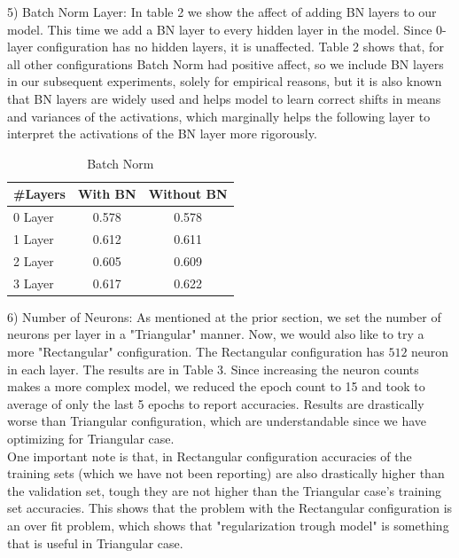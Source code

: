 \documentclass[conference,compsoc]{IEEEtran}
\begin{document}
5) Batch Norm Layer: In table 2 we show the affect of adding BN layers to our model. This time we add a BN layer to every hidden layer in the model. Since 0-layer configuration has no hidden layers, it is unaffected. Table 2 shows that, for all other configurations Batch Norm had positive affect, so we include BN layers in our subsequent experiments, solely for empirical reasons, but it is also known that BN layers are widely used and helps model to learn correct shifts in means and variances of the activations, which marginally helps the following layer to interpret the activations of the BN layer more rigorously.  \\

\begin{table}[]
\centering
\caption{Batch Norm}
\label{my-label}
\begin{tabular}{l|cc}
\#Layers & \multicolumn{1}{l}{With BN} & \multicolumn{1}{l}{Without BN} \\ \hline
0 Layer  & 0.578                       & 0.578                          \\ \cline{2-3} 
1 Layer  & 0.612                       & 0.611                          \\ \cline{2-3} 
2 Layer  & 0.605                      & 0.609                          \\ \cline{2-3} 
3 Layer  & 0.617                      & 0.622                         
\end{tabular}
\end{table}

6) Number of Neurons:  As mentioned at the prior section, we set the number of neurons per layer in a "Triangular" manner. Now, we would also like to try a more "Rectangular" configuration. The Rectangular configuration has $512$ neuron in each layer. The results are in Table 3. Since increasing the neuron counts makes a more complex model, we reduced the epoch count to 15 and took to average of only the last 5 epochs to report accuracies. Results are drastically worse than Triangular configuration, which are understandable since we have optimizing for Triangular case. \\

One important note is that, in Rectangular configuration accuracies of the training sets (which we have not been reporting) are also drastically higher than the validation set, tough they are not higher than the Triangular case's training set accuracies. This shows that the problem with the Rectangular configuration is an over fit problem, which shows that "regularization trough model" is something that is useful in Triangular case.
\end{document}
